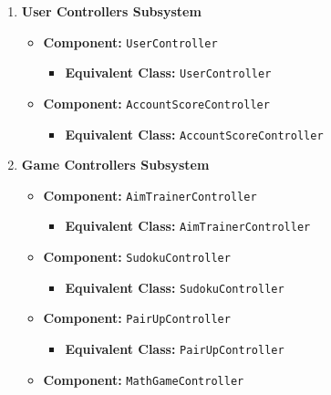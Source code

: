 \documentclass[11pt,a4paper]{article}
\begin{document}
\begin{enumerate}[label=\textbf{\arabic*.}, ref=\arabic*]
        \begin{enumerate}[label=\textbf{\alph*.}, ref=\theenumi.\alph*]
            \item \textbf{User Controllers Subsystem}
                \begin{itemize}
                    \item \textbf{Component:} \texttt{UserController}
                        \begin{itemize}
                            \item \textbf{Equivalent Class:} \texttt{UserController}
                        \end{itemize}
                    \item \textbf{Component:} \texttt{AccountScoreController}
                        \begin{itemize}
                            \item \textbf{Equivalent Class:} \texttt{AccountScoreController}
                        \end{itemize}
                \end{itemize}
            \item \textbf{Game Controllers Subsystem}
                \begin{itemize}
                    \item \textbf{Component:} \texttt{AimTrainerController}
                        \begin{itemize}
                            \item \textbf{Equivalent Class:} \texttt{AimTrainerController}
                        \end{itemize}
                    \item \textbf{Component:} \texttt{SudokuController}
                        \begin{itemize}
                            \item \textbf{Equivalent Class:} \texttt{SudokuController}
                        \end{itemize}
                    \item \textbf{Component:} \texttt{PairUpController}
                        \begin{itemize}
                            \item \textbf{Equivalent Class:} \texttt{PairUpController}
                        \end{itemize}
                    \item \textbf{Component:} \texttt{MathGameController}

\end{itemize}
\end{enumerate}
\end{enumerate}
\end{document}
